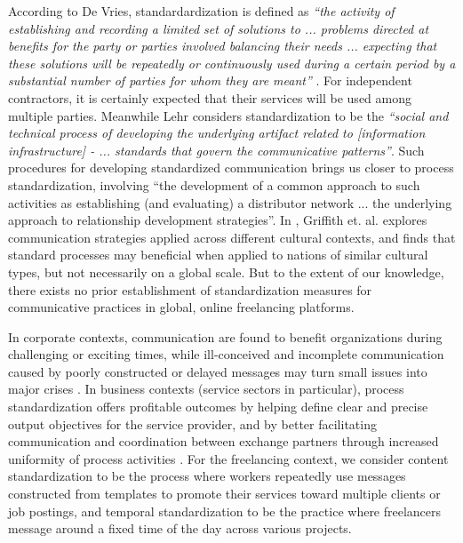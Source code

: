 According to De Vries, standardardization is defined as \textit{``the activity of establishing and recording a limited set of solutions to ... problems directed at benefits for the party or parties involved balancing their needs ... expecting that these solutions will be repeatedly or continuously used during a certain period by a substantial number of parties for whom they are meant''} \cite{Munstermann2008-yj}. For independent contractors, it is certainly expected that their services will be used among multiple parties. Meanwhile Lehr \cite{Hanseth1996-ux} considers standardization to be the \textit{``social and technical process of developing the underlying artifact related to [information infrastructure] - ... standards that govern the communicative patterns''}. Such procedures for developing standardized communication brings us closer to process standardization, involving ``the development of a common approach to such activities as establishing (and evaluating) a distributor network ... the underlying approach to relationship development strategies''\cite{Griffith}. In \cite{Griffith}, Griffith et. al. explores communication strategies applied across different cultural contexts, and finds that standard processes may beneficial when applied to nations of similar cultural types, but not necessarily on a global scale. But to the extent of our knowledge, there exists no prior establishment of standardization measures for communicative practices in global, online freelancing platforms.
 
In corporate contexts, communication are found to benefit organizations during challenging or exciting times, while ill-conceived and incomplete communication caused by poorly constructed or delayed messages may turn small issues into major crises \cite{Newman2016-nd}. In business contexts (service sectors in particular), process standardization offers profitable outcomes by helping define clear and precise output objectives for the service provider, and by better facilitating communication and coordination between exchange partners through increased uniformity of process activities \cite{Ramakumar2004-fv, Munstermann2010-yf, Wuellenweber2009-pa}. For the freelancing context, we consider content standardization to be the process where workers repeatedly use messages constructed from templates to promote their services toward multiple clients or job postings, and temporal standardization to be the practice where freelancers message around a fixed time of the day across various projects.



